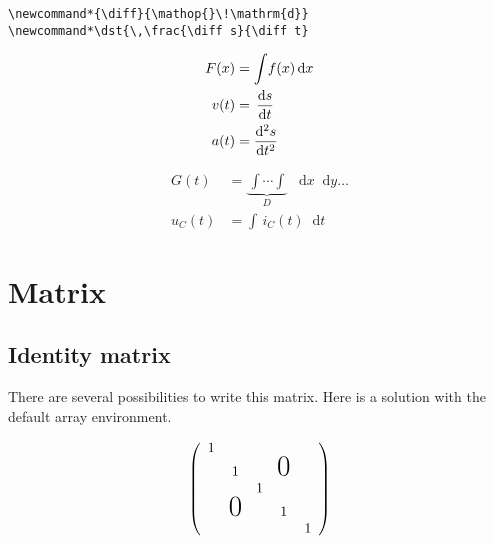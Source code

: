 \begin{table}[htb]
\begin{lstlisting}
\newcommand*{\diff}{\mathop{}\!\mathrm{d}}
\newcommand*\dst{\,\frac{\diff s}{\diff t}
\end{lstlisting}

\newcommand*{\diff}{\mathop{}\!\mathrm{d}}


\iffalse
\newcommand*\dy{\,\mathrm{d}y}
\newcommand*\dx{\,\mathrm{d}x}
\newcommand*\dyx{\,\frac{\mathrm{d}y}{\mathrm{d}x}}
\newcommand*\ds{\,\mathrm{d}s}
\newcommand*\dt{\,\mathrm{d}t}
\newcommand*\dst{\,\frac{\mathrm{d}s}{\mathrm{d}t}}
\fi

\begin{LTXexample}[preset=\raggedright,width=0.4\linewidth]
\begin{align*}
F(x) &= \int\!f(x)\diff x\\
v(t) &= \dst\\
a(t) &= \frac{\diff{}^2s}{\diff t^2}
\end{align*}
\end{LTXexample}

\begin{LTXexample}[preset=\raggedright,width=0.4\linewidth]
\begin{align*}
G(t)   &= \underbrace{\,\int\cdots\!\int\!\!}_D\;\diff x\diff y\ldots\\
u_C(t) &= \int\!\,i_C(t)\diff t  
\end{align*}
\end{LTXexample}

\bigskip
\section{Matrix}
\subsection{Identity matrix}

There are several possibilities to write this matrix. Here is a solution
with the default array environment.

\begin{LTXexample}[width=0.4\linewidth]
\[
\left(
  \begin{array}{ccccc}
    1\\
     & 1 &  & \text{{\huge{0}}}\\
     &  & 1\\
     & \text{{\huge{0}}} &  & 1\\
     &  &  &  & 1
  \end{array}
\right) 
\]
\end{LTXexample}


\end{table}
